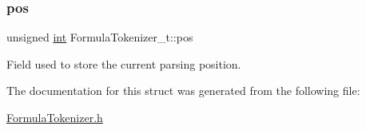 \subsubsection{\texorpdfstring{pos}{pos}}
{\footnotesize\ttfamily unsigned \hyperlink{lp__lib_8h_adeb9ec6400320e4923ac9d836d509ddb}{int} Formula\+Tokenizer\+\_\+t\+::pos}

Field used to store the current parsing position. 

The documentation for this struct was generated from the following file\+:\begin{DoxyCompactItemize}
\item 
\hyperlink{_formula_tokenizer_8h}{Formula\+Tokenizer.\+h}\end{DoxyCompactItemize}
